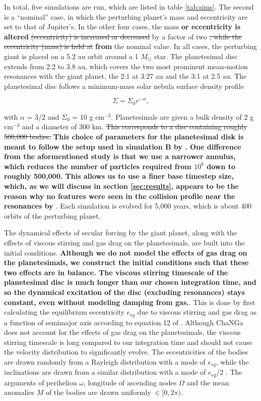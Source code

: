 \documentclass[fleqn,usenatbib]{mnras}
\begin{document}
In total, five simulations are run, which are listed in table
\ref{tab:sims}. The second
is a ``nominal'' case, in which the perturbing planet's mass and 
eccentricity are set to that of Jupiter's. In the other four cases, the mass \textbf{or eccentricity is altered} \sout{(eccentricity) is increased or decreased} by a factor of two \sout{, while the 
eccentricity (mass) is held at} \textbf{from} the nominal value. In all cases, the perturbing giant is placed on a 5.2 au orbit around a 1 $M_{\odot}$ star. The 
planetesimal disc extends from 2.2 to 3.8 au, which covers the two most prominent mean-motion resonances with the giant planet, the 2:1 at 3.27 au 
and the 3:1 at 2.5 au. The planetesimal disc follows a minimum-mass solar nebula surface density profile \citep{1981PThPS..70...35H}

\begin{equation}\label{eq:surf_den}
	\Sigma = \Sigma_{0} r^{-\alpha},
\end{equation}

\noindent with $\alpha$ = 3/2 and $\Sigma_{0}$ = 10 g cm$^{-2}$. Planetesimals are given a bulk density of 2 g cm$^{-3}$ and a diameter of 
300 km. \sout{This corresponds to a disc containing roughly 500,000 bodies.} \textbf{This choice of parameters for the planetesimal disk is meant to follow the setup used in simulation B by \citet{2000Icar..143...45R}. One difference from the aformentioned study is that we use a narrower annulus, which reduces the number of particles required from $10^6$ down to roughly 500,000. This allows us to use a finer base timestep size, which, as we will discuss in section \ref{sec:results}, appears to be the reason why no features were seen in the collision profile near the resonances by \citet{2000Icar..143...45R}}. Each simulation is evolved for 5,000 years, which is about 400 orbits 
of the perturbing planet.

The dynamical effects of secular forcing by the giant planet, along with  the effects of viscous stirring and gas drag on the planetesimals, are 
built into the initial conditions. \textbf{Although we do not model the effects of gas drag on the planetesimals, we construct the initial conditions such that these two effects are in balance. The viscous stirring timescale of the planetesimal disc is much longer than our chosen integration time, and so the dynamical excitation of the disc (excluding resonances) stays constant, even without modeling damping from gas.}. This is done by first calculating the equilibrium eccentricity $e_{eq}$ due to viscous stirring and gas drag as a 
function of semimajor axis according to equation 12 of \citet{2002ApJ...581..666K}. Although {\sc ChaNGa} does not account for the effects of 
gas drag on the planetesimals, the viscous stirring timescale is long compared to our integration time and should not cause the velocity 
distribution to significantly evolve. The eccentricities of the bodies are drawn randomly from a Rayleigh distribution with a mode of $e_{eq}$, 
while the inclinations are drawn from a similar distribution with a mode of $e_{eq}$/2 \citep{1993MNRAS.263..875I}. The arguments of perihelion 
$\omega$, longitude of ascending nodes $\Omega$ and the mean anomalies $M$ of the bodies are drawn uniformly $\in [0, 2 \pi)$.
\end{document}
